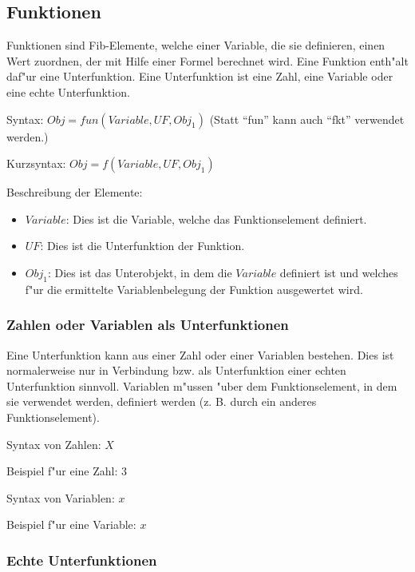 

\subsection{Funktionen}
\label{fibFunction}\label{secFibFunction}

Funktionen sind Fib-Elemente, welche einer Variable, die sie definieren, einen Wert zuordnen, der mit Hilfe einer Formel berechnet wird.
Eine Funktion enth"alt daf"ur eine Unterfunktion. Eine Unterfunktion ist eine Zahl, eine Variable oder eine echte Unterfunktion.

\bigskip\noindent
Syntax:
$Obj = fun( Variable ,UF ,Obj_1 )$
(Statt ``fun'' kann auch ``fkt'' verwendet werden.)

\bigskip\noindent
Kurzsyntax:
$Obj = f( Variable ,UF ,Obj_1 )$

\bigskip\noindent
Beschreibung der Elemente:
\begin{itemize}
 \item $Variable$: Dies ist die Variable, welche das Funktionselement definiert.
 \item $UF$: Dies ist die Unterfunktion der Funktion.
 \item $Obj_1$: Dies ist das Unterobjekt, in dem die $Variable$ definiert ist und welches f"ur die ermittelte Variablenbelegung der Funktion ausgewertet wird.
\end{itemize}


\subsubsection{Zahlen oder Variablen als Unterfunktionen}
\label{fibUnderFunctionValueVariable}

Eine Unterfunktion kann aus einer Zahl oder einer Variablen bestehen. Dies ist normalerweise nur in Verbindung bzw. als Unterfunktion einer echten Unterfunktion sinnvoll.
Variablen m"ussen "uber dem Funktionselement, in dem sie verwendet werden, definiert werden (z. B. durch ein anderes Funktionselement).

\bigskip\noindent
Syntax von Zahlen:
$X$

\bigskip\noindent
Beispiel f"ur eine Zahl:
$3$

\bigskip\noindent
Syntax von Variablen:
$x$

\bigskip\noindent
Beispiel f"ur eine Variable:
$x$


\subsubsection{Echte Unterfunktionen}
\label{fibUnderFunction}

